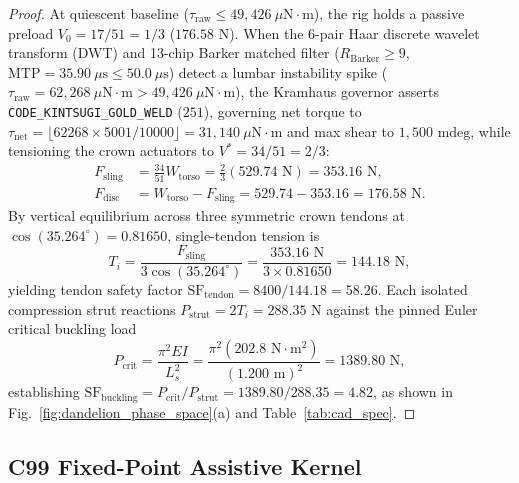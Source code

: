 \documentclass[aps,prl,twocolumn,superscriptaddress,10pt]{revtex4-2}
\begin{document}
\begin{proof}
At quiescent baseline ($\tau_{\text{raw}} \le 49,426\ \mu\text{N}\cdot\text{m}$), the rig holds a passive preload $V_0 = 17/51 = 1/3$ ($176.58\text{ N}$). When the 6-pair Haar discrete wavelet transform (DWT) and 13-chip Barker matched filter ($R_{\text{Barker}} \ge 9$, $\text{MTP} = 35.90\ \mu\text{s} \le 50.0\ \mu\text{s}$) detect a lumbar instability spike ($\tau_{\text{raw}} = 62,268\ \mu\text{N}\cdot\text{m} > 49,426\ \mu\text{N}\cdot\text{m}$), the Kramhaus governor asserts \texttt{CODE\_KINTSUGI\_GOLD\_WELD} ($251$), governing net torque to $\tau_{\text{net}} = \lfloor 62268 \times 5001 / 10000 \rfloor = 31,140\ \mu\text{N}\cdot\text{m}$ and max shear to $1,500\text{ mdeg}$, while tensioning the crown actuators to $V^* = 34/51 = 2/3$:
\begin{align}
F_{\text{sling}} &= \frac{34}{51} W_{\text{torso}} = \frac{2}{3} (529.74\text{ N}) = 353.16\text{ N}, \label{eq:f_sling} \\
F_{\text{disc}} &= W_{\text{torso}} - F_{\text{sling}} = 529.74 - 353.16 = 176.58\text{ N}. \label{eq:f_disc}
\end{align}
By vertical equilibrium across three symmetric crown tendons at $\cos(35.264^\circ) = 0.81650$, single-tendon tension is
\begin{equation}
T_i = \frac{F_{\text{sling}}}{3 \cos(35.264^\circ)} = \frac{353.16\text{ N}}{3 \times 0.81650} = 144.18\text{ N},
\label{eq:tendon_tension}
\end{equation}
yielding tendon safety factor $\text{SF}_{\text{tendon}} = 8400 / 144.18 = 58.26$. Each isolated compression strut reactions $P_{\text{strut}} = 2 T_i = 288.35\text{ N}$ against the pinned Euler critical buckling load
\begin{equation}
P_{\text{crit}} = \frac{\pi^2 E I}{L_s^2} = \frac{\pi^2 (202.8\text{ N}\cdot\text{m}^2)}{(1.200\text{ m})^2} = 1389.80\text{ N},
\label{eq:euler_crit}
\end{equation}
establishing $\text{SF}_{\text{buckling}} = P_{\text{crit}} / P_{\text{strut}} = 1389.80 / 288.35 = 4.82$, as shown in Fig.~\ref{fig:dandelion_phase_space}(a) and Table~\ref{tab:cad_spec}.
\end{proof}

\subsection{C99 Fixed-Point Assistive Kernel}
\end{document}
